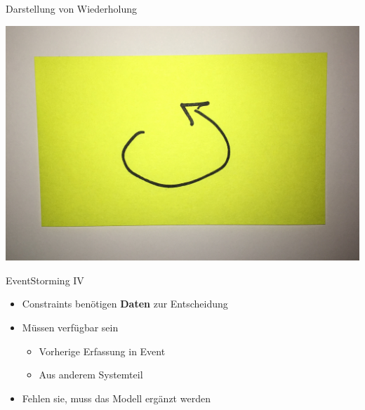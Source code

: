 \begin{frame}[fragile]{Darstellung von Wiederholung}

\begin{center}
\includegraphics[width=.5\textwidth]{pics/darstellung_von_wiederholung.jpg}
\end{center}

\end{frame}


\begin{frame}[fragile]{EventStorming IV}

\begin{itemize}
\item Constraints benötigen \textbf{Daten} zur Entscheidung
\item Müssen verfügbar sein
\begin{itemize}
\item Vorherige Erfassung in Event
\item Aus anderem Systemteil
\end{itemize}
\item Fehlen sie, muss das Modell ergänzt werden
\end{itemize}

\end{frame}

